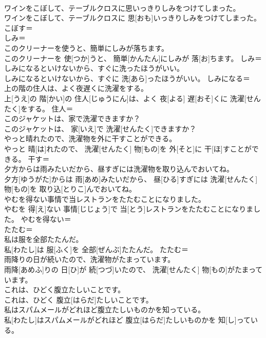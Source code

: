 \documentclass[8pt]{extreport}
\begin{document}
\begin{CJK}{UTF8}{min}
\\	ワインをこぼして、テーブルクロスに思いっきりしみをつけてしまった。	
\\	ワインをこぼして、テーブルクロスに 思[おも]いっきりしみをつけてしまった。	こぼす＝ 
\\	しみ＝ 
\\	このクリーナーを使うと、簡単にしみが落ちます。	
\\	このクリーナーを 使[つか]うと、 簡単[かんたん]にしみが 落[お]ちます。	しみ＝ 
\\	しみになるといけないから、すぐに洗ったほうがいい。	
\\	しみになるといけないから、すぐに 洗[あら]ったほうがいい。	しみになる＝ 
\\	上の階の住人は、よく夜遅くに洗濯をする。	
\\	上[うえ]の 階[かい]の 住人[じゅうにん]は、よく 夜[よる] 遅[おそ]くに 洗濯[せんたく]をする。	住人＝ 
\\	このジャケットは、家で洗濯できますか？	
\\	このジャケットは、 家[いえ]で 洗濯[せんたく]できますか？	
\\	やっと晴れたので、洗濯物を外に干すことができる。	
\\	やっと 晴[は]れたので、 洗濯[せんたく] 物[もの]を 外[そと]に 干[ほ]すことができる。	干す＝ 
\\	夕方からは雨みたいだから、昼すぎには洗濯物を取り込んでおいてね。	
\\	夕方[ゆうがた]からは 雨[あめ]みたいだから、 昼[ひる]すぎには 洗濯[せんたく] 物[もの]を 取り込[とりこ]んでおいてね。	
\\	やむを得ない事情で当レストランをたたむことになりました。	
\\	やむを 得[え]ない 事情[じじょう]で 当[とう]レストランをたたむことになりました。	やむを得ない＝ 
\\	たたむ＝ 
\\	私は服を全部たたんだ。	
\\	私[わたし]は 服[ふく]を 全部[ぜんぶ]たたんだ。	たたむ＝ 
\\	雨降りの日が続いたので、洗濯物がたまっています。	
\\	雨降[あめふ]りの 日[ひ]が 続[つづ]いたので、 洗濯[せんたく] 物[もの]がたまっています。	
\\	これは、ひどく腹立たしいことです。	
\\	これは、ひどく 腹立[はらだ]たしいことです。	
\\	私はスパムメールがどれほど腹立たしいものかを知っている。	
\\	私[わたし]はスパムメールがどれほど 腹立[はらだ]たしいものかを 知[し]っている。	

\end{CJK}
\end{document}
